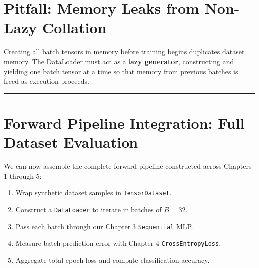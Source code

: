 \documentclass[
  letterpaper,
]{scrbook}
\providecommand{\tightlist}{%
  \setlength{\itemsep}{0pt}\setlength{\parskip}{0pt}}
\begin{document}
\section{Pitfall: Memory Leaks from Non-Lazy
Collation}\label{pitfall-memory-leaks-from-non-lazy-collation}

Creating all batch tensors in memory before training begins duplicates
dataset memory. The DataLoader must act as a \textbf{lazy generator},
constructing and yielding one batch tensor at a time so that memory from
previous batches is freed as execution proceeds.

\begin{center}\rule{0.5\linewidth}{0.5pt}\end{center}

\section{Forward Pipeline Integration: Full Dataset
Evaluation}\label{forward-pipeline-integration-full-dataset-evaluation}

We can now assemble the complete forward pipeline constructed across
Chapters 1 through 5:

\begin{enumerate}
\def\labelenumi{\arabic{enumi}.}
\tightlist
\item
  Wrap synthetic dataset samples in \texttt{TensorDataset}.
\item
  Construct a \texttt{DataLoader} to iterate in batches of \(B = 32\).
\item
  Pass each batch through our Chapter 3 \texttt{Sequential} MLP.
\item
  Measure batch prediction error with Chapter 4
  \texttt{CrossEntropyLoss}.
\item
  Aggregate total epoch loss and compute classification accuracy.
\end{enumerate}
\end{document}
